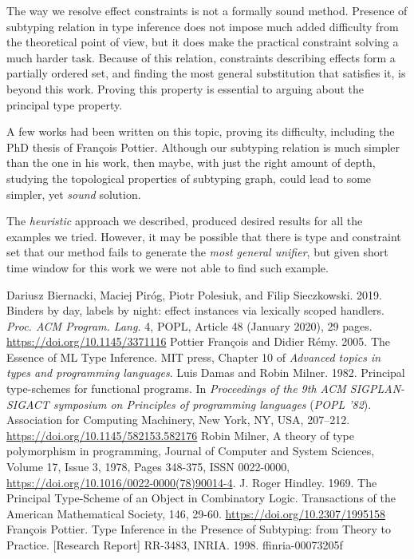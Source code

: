 \documentclass[declaration,shortabstract]{iithesis}
\theoremstyle{definition} \newtheorem{definition}{Definition}[section]
\begin{document}
The way we resolve effect constraints is not a formally sound method.
Presence of subtyping relation in type inference does not impose
much added difficulty from the theoretical point of view,
but it does make the practical constraint solving a much harder task.
Because of this relation, constraints describing effects
form a partially ordered set, and finding the most general
substitution that satisfies it, is beyond this work.
Proving this property is essential to arguing about the
principal type property.

A few works had been written on this topic, proving its difficulty,
including the PhD thesis of François Pottier\cite{francois}.
Although our subtyping relation is much simpler than the one in his work,
then maybe, with just the right amount of depth,
studying the topological properties of subtyping graph,
could lead to some simpler, yet \textit{sound} solution.

The \textit{heuristic} approach we described, produced desired results
for all the examples we tried.
However, it may be possible that there is type and constraint set that our method
fails to generate the \textit{most general unifier}, but given short time window for
this work we were not able to find such example.


\begin{thebibliography}{1}
    Dariusz Biernacki, Maciej Piróg, Piotr Polesiuk, and Filip Sieczkowski. 2019. Binders by day, labels by night: effect instances via lexically scoped handlers. \textit{Proc. ACM Program. Lang.} 4, POPL, Article 48 (January 2020), 29 pages. \url{https://doi.org/10.1145/3371116}
    Pottier François and Didier Rémy. 2005.
    The Essence of ML Type Inference.
    MIT press, Chapter 10 of \textit{Advanced topics in types and programming languages}.
    Luis Damas and Robin Milner. 1982. Principal type-schemes for functional programs. In \textit{Proceedings of the 9th ACM SIGPLAN-SIGACT symposium on Principles of programming languages} (\textit{POPL '82}). Association for Computing Machinery, New York, NY, USA, 207–212. \url{https://doi.org/10.1145/582153.582176}
    Robin Milner,
    A theory of type polymorphism in programming,
    Journal of Computer and System Sciences,
    Volume 17, Issue 3,
    1978,
    Pages 348-375,
    ISSN 0022-0000,
     \url{https://doi.org/10.1016/0022-0000(78)90014-4}.
    J. Roger Hindley. 1969. The Principal Type-Scheme of an Object in Combinatory Logic. Transactions of the American Mathematical Society, 146, 29-60. \url{https://doi.org/10.2307/1995158}
    François Pottier. Type Inference in the Presence of Subtyping: from Theory to Practice. [Research
    Report] RR-3483, INRIA. 1998. ffinria-00073205f
\end{thebibliography}
\end{document}
